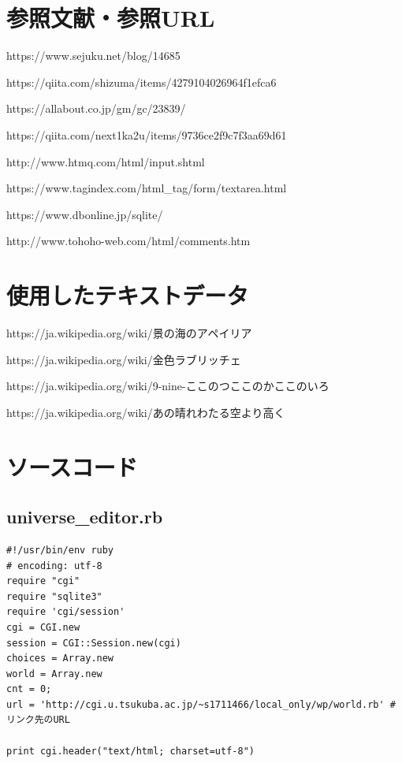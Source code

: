\documentclass[12pt,a4paper]{jarticle}
\begin{document}
\begin{ttfamily}
\section*{参照文献・参照URL}
\par https://www.sejuku.net/blog/14685
\par https://qiita.com/shizuma/items/4279104026964f1efca6
\par https://allabout.co.jp/gm/gc/23839/
\par https://qiita.com/next1ka2u/items/9736ce2f9c7f3aa69d61
\par http://www.htmq.com/html/input.shtml
\par https://www.tagindex.com/html\_tag/form/textarea.html
\par https://www.dbonline.jp/sqlite/
\par http://www.tohoho-web.com/html/comments.htm


\section*{使用したテキストデータ}
\par https://ja.wikipedia.org/wiki/景の海のアペイリア
\par https://ja.wikipedia.org/wiki/金色ラブリッチェ
\par https://ja.wikipedia.org/wiki/9-nine-ここのつここのかここのいろ
\par https://ja.wikipedia.org/wiki/あの晴れわたる空より高く

\newpage
\section*{ソースコード}
\subsection*{universe\_editor.rb}
\begin{oframed}
 \fontsize{8pt}{8pt}\selectfont
 \begin{verbatim}
#!/usr/bin/env ruby
# encoding: utf-8
require "cgi"
require "sqlite3"
require 'cgi/session'
cgi = CGI.new
session = CGI::Session.new(cgi)
choices = Array.new
world = Array.new
cnt = 0;
url = 'http://cgi.u.tsukuba.ac.jp/~s1711466/local_only/wp/world.rb' # リンク先のURL

print cgi.header("text/html; charset=utf-8")


\end{verbatim}
\end{oframed}
\end{ttfamily}
\end{document}
